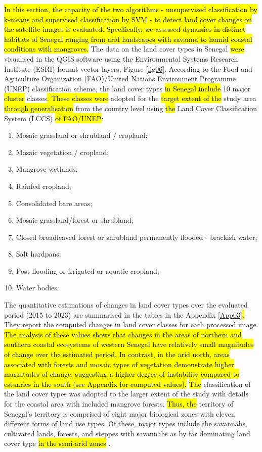 \documentclass[earth,article,submit,pdftex,moreauthors]{Definitions/mdpi}
\begin{document}
\hl{In this section, the capacity of the two algorithms - unsupervised classification by k-means and supervised classification by SVM - to detect land cover changes on the satellite images is evaluated. Specifically, we assessed dynamics in distinct habitats of Senegal ranging from arid landscapes with savanna to humid coastal conditions with mangroves. }The data on the land cover types in Senegal\hl{ were} visualised in the QGIS software using the Environmental Systems Research Institute (ESRI) format vector layers, Figure \ref{fig06}.\hl{ }According to the Food and Agriculture Organization (FAO)/United Nations Environment Programme (UNEP) classification scheme, the land cover types \hl{in Senegal include} 10 major \hl{cluster} classes\hl{. These classes were} adopted for the \hl{target extent of the }study area \hl{through generalisation} from the\hl{ }country level using \hl{the} Land Cover Classification System (LCCS) \hl{of FAO/UNEP}: 

 \begin{enumerate}
        \item Mosaic grassland or shrubland / cropland; 
        \item Mosaic vegetation / cropland; 
        \item Mangrove wetlands; 
        \item Rainfed cropland; 
        \item Consolidated bare areas;
        \item Mosaic grassland/forest or shrubland; 
        \item Closed broadleaved forest or shrubland permanently flooded - brackish water; 
        \item Salt hardpans; 
        \item Post flooding or irrigated or aquatic cropland; 
        \item Water bodies. 
\end{enumerate}

The quantitative estimations of changes in land cover types over the evaluated period (2015 to 2023) are summarised in the tables in the Appendix \ref{App03}\hl{. }They report the computed changes in land cover classes for each processed image. \hl{The analysis of these values shows that changes in the areas of northern and southern coastal ecosystems of western Senegal have relatively small magnitudes of change over the estimated period. In contrast, in the arid north, areas associated with forests and mosaic types of vegetation demonstrate higher magnitudes of change, suggesting a higher degree of instability compared to estuaries in the south (see Appendix for computed values).} \hl{The} classification of the land cover types was adopted to the larger extent of the study with details for the coastal area with included mangrove forests. \hl{Thus, the} territory of Senegal's territory is comprised of eight major biological zones with eleven different forms of land use types. Of these, major\hl{ }types\hl{ }include the savannahs, cultivated lands, forests, and steppes with savannahs as by far dominating land cover type \hl{in the semi-arid zones }\cite{WOOMER2004625}. 
\end{document}
